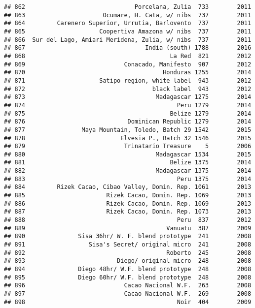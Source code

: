 \documentclass[
]{article}
\begin{document}
\begin{verbatim}
## 862                               Porcelana, Zulia  733        2011
## 863                      Ocumare, H. Cata, w/ nibs  737        2011
## 864         Carenero Superior, Urrutia, Barlovento  737        2011
## 865                     Coopertiva Amazona w/ nibs  737        2011
## 866  Sur del Lago, Amiari Meridena, Zulia, w/ nibs  737        2011
## 867                                  India (south) 1788        2016
## 868                                         La Red  821        2012
## 869                            Conacado, Manifesto  907        2012
## 870                                       Honduras 1255        2014
## 871                     Satipo region, white label  943        2012
## 872                                    black label  943        2012
## 873                                     Madagascar 1275        2014
## 874                                           Peru 1279        2014
## 875                                         Belize 1279        2014
## 876                             Dominican Republic 1279        2014
## 877                Maya Mountain, Toledo, Batch 29 1542        2015
## 878                           Elvesia P., Batch 32 1546        2015
## 879                            Trinatario Treasure    5        2006
## 880                                     Madagascar 1534        2015
## 881                                         Belize 1375        2014
## 882                                     Madagascar 1375        2014
## 883                                           Peru 1375        2014
## 884         Rizek Cacao, Cibao Valley, Domin. Rep. 1061        2013
## 885                       Rizek Cacao, Domin. Rep. 1069        2013
## 886                       Rizek Cacao, Domin. Rep. 1069        2013
## 887                       Rizek Cacao, Domin. Rep. 1073        2013
## 888                                           Peru  837        2012
## 889                                        Vanuatu  387        2009
## 890               Sisa 36hr/ W. F. blend prototype  241        2008
## 891                  Sisa's Secret/ original micro  241        2008
## 892                                        Roberto  245        2008
## 893                          Diego/ original micro  248        2008
## 894               Diego 48hr/ W.F. blend prototype  248        2008
## 895               Diego 60hr/ W.F. blend prototype  248        2008
## 896                            Cacao Nacional W.F.  263        2008
## 897                            Cacao Nacional W.F.  269        2008
## 898                                           Noir  404        2009

\end{verbatim}
\end{document}
